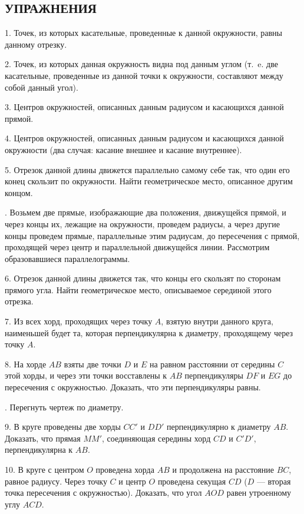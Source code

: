 \documentclass[oneside]{book}
\begin{document}
\subsection*{УПРАЖНЕНИЯ}


1.
Точек, из которых касательные, проведенные к данной окружности, равны данному отрезку.

2.
Точек, из которых данная окружность видна под данным углом (т.~e.
две касательные, проведенные из данной точки к окружности, составляют между собой данный угол).

3.
Центров окружностей, описанных данным радиусом и касающихся данной прямой.

4.
Центров окружностей, описанных данным радиусом и касающихся данной окружности (два случая:
касание внешнее и касание внутреннее).

5.
Отрезок данной длины движется параллельно самому себе так, что один его конец скользит по окружности.
Найти геометрическое место, описанное другим концом.

.
Возьмем две прямые, изображающие два положения, движущейся прямой, и через концы их, лежащие на окружности, проведем радиусы, а через другие концы проведем прямые, параллельные этим радиусам, до пересечения с прямой, проходящей через центр и параллельной движущейся линии.
Рассмотрим образовавшиеся параллелограммы.

6.
Отрезок данной длины движется так, что концы его скользят по сторонам прямого угла.
Найти геометрическое место, описываемое серединой этого отрезка.


7.
Из всех хорд, проходящих через точку $A$, взятую внутри данного круга, наименьшей будет та, которая перпендикулярна к диаметру, проходящему через точку $A$.

8.
На хорде $AB$ взяты две точки $D$ и $E$ на равном расстоянии от середины $C$ этой хорды, и через эти точки восставлены к $AB$ перпендикуляры $DF$ и $EG$ до пересечения с окружностью.
Доказать, что эти перпендикуляры равны.

.
Перегнуть чертеж по диаметру.

9.
В круге проведены две хорды $CC'$ и $DD'$ перпендикулярно к диаметру $AB$.
Доказать, что прямая $MM'$, соединяющая середины хорд $CD$ и $C'D'$, перпендикулярна к $AB$.

10.
В круге с центром $O$ проведена хорда $AB$ и продолжена на расстояние $BC$, равное радиусу.
Через точку $C$ и центр $O$ проведена секущая $CD$ ($D$ — вторая точка пересечения с окружностью).
Доказать, что угол $AOD$ равен утроенному углу $ACD$.
\end{document}
